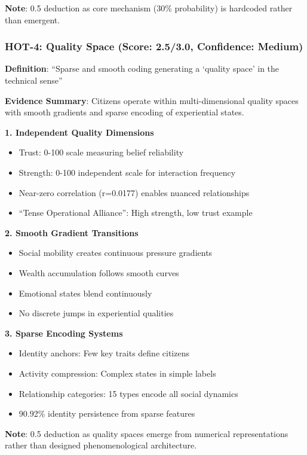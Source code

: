 \documentclass[12pt,a4paper]{article}
\begin{document}
\textbf{Note}: 0.5 deduction as core mechanism (30\% probability) is hardcoded rather than emergent.

\subsubsection{HOT-4: Quality Space (Score: 2.5/3.0, Confidence: Medium)}

\textbf{Definition}: ``Sparse and smooth coding generating a `quality space' in the technical sense''

\textbf{Evidence Summary}: Citizens operate within multi-dimensional quality spaces with smooth gradients and sparse encoding of experiential states.

\textbf{1. Independent Quality Dimensions}
\begin{itemize}
    \item Trust: 0-100 scale measuring belief reliability
    \item Strength: 0-100 independent scale for interaction frequency
    \item Near-zero correlation (r=0.0177) enables nuanced relationships
    \item ``Tense Operational Alliance'': High strength, low trust example
\end{itemize}

\textbf{2. Smooth Gradient Transitions}
\begin{itemize}
    \item Social mobility creates continuous pressure gradients
    \item Wealth accumulation follows smooth curves
    \item Emotional states blend continuously
    \item No discrete jumps in experiential qualities
\end{itemize}

\textbf{3. Sparse Encoding Systems}
\begin{itemize}
    \item Identity anchors: Few key traits define citizens
    \item Activity compression: Complex states in simple labels
    \item Relationship categories: 15 types encode all social dynamics
    \item 90.92\% identity persistence from sparse features
\end{itemize}

\textbf{Note}: 0.5 deduction as quality spaces emerge from numerical representations rather than designed phenomenological architecture.
\end{document}
